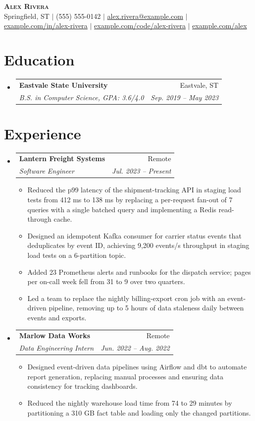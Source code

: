\documentclass[letterpaper,11pt]{article}
\makeatletter
\newcommand{\resumeItem}[1]{
  \item\small{
    {#1 \vspace{-2pt}}
  }
}
\newcommand{\resumeSubheading}[4]{
  \vspace{-2pt}\item
    \begin{tabular*}{0.97\textwidth}[t]{l@{\extracolsep{\fill}}r}
      \textbf{#1} & #2 \\
      \textit{\small#3} & \textit{\small #4} \\
    \end{tabular*}\vspace{-7pt}
}
\newcommand{\resumeSubHeadingListStart}{\begin{itemize}[leftmargin=0.15in, label={}]}
\newcommand{\resumeSubHeadingListEnd}{\end{itemize}}
\newcommand{\resumeItemListStart}{\begin{itemize}}
\newcommand{\resumeItemListEnd}{\end{itemize}\vspace{-5pt}}
\makeatother
\begin{document}
\begin{center}
    \textbf{\Huge \scshape Alex Rivera} \\ \vspace{1pt}
    \small Springfield, ST $|$ (555) 555-0142 $|$ \href{mailto:alex.rivera@example.com}{alex.rivera@example.com} $|$ \href{https://example.com/in/alex-rivera}{example.com/in/alex-rivera} $|$ \href{https://example.com/code/alex-rivera}{example.com/code/alex-rivera} $|$ \href{https://example.com/alex}{example.com/alex}
\end{center}

\section{Education}
  \resumeSubHeadingListStart
    \resumeSubheading{Eastvale State University}{Eastvale, ST}{B.S. in Computer Science, GPA: 3.6/4.0}{Sep. 2019 -- May 2023}
  \resumeSubHeadingListEnd

\section{Experience}
  \resumeSubHeadingListStart
    \resumeSubheading{Lantern Freight Systems}{Remote}{Software Engineer}{Jul. 2023 -- Present}
      \resumeItemListStart
        \resumeItem{Reduced the p99 latency of the shipment-tracking API in staging load tests from 412 ms to 138 ms by replacing a per-request fan-out of 7 queries with a single batched query and implementing a Redis read-through cache.}
        \resumeItem{Designed an idempotent Kafka consumer for carrier status events that deduplicates by event ID, achieving 9,200 events/s throughput in staging load tests on a 6-partition topic.}
        \resumeItem{Added 23 Prometheus alerts and runbooks for the dispatch service; pages per on-call week fell from 31 to 9 over two quarters.}
        \resumeItem{Led a team to replace the nightly billing-export cron job with an event-driven pipeline, removing up to 5 hours of data staleness daily between events and exports.}
      \resumeItemListEnd
    \resumeSubheading{Marlow Data Works}{Remote}{Data Engineering Intern}{Jun. 2022 -- Aug. 2022}
      \resumeItemListStart
        \resumeItem{Designed event-driven data pipelines using Airflow and dbt to automate report generation, replacing manual processes and ensuring data consistency for tracking dashboards.}
        \resumeItem{Reduced the nightly warehouse load time from 74 to 29 minutes by partitioning a 310 GB fact table and loading only the changed partitions.}
      \resumeItemListEnd
  \resumeSubHeadingListEnd
\end{document}
